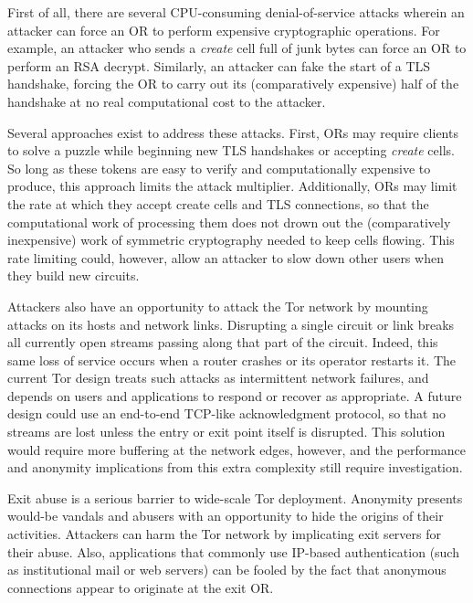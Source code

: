 \documentclass[times,10pt,twocolumn]{article}
\begin{document}
First of all, there are several CPU-consuming denial-of-service
attacks wherein an attacker can force an OR to perform expensive
cryptographic operations.  For example, an attacker who sends a
\emph{create} cell full of junk bytes can force an OR to perform an RSA
decrypt.  Similarly, an attacker can
fake the start of a TLS handshake, forcing the OR to carry out its
(comparatively expensive) half of the handshake at no real computational
cost to the attacker.

Several approaches exist to address these attacks. First, ORs may
require clients to solve a puzzle \cite{puzzles-tls} while beginning new
TLS handshakes or accepting \emph{create} cells.  So long as these
tokens are easy to verify and computationally expensive to produce, this
approach limits the attack multiplier.  Additionally, ORs may limit
the rate at which they accept create cells and TLS connections, so that
the computational work of processing them does not drown out the (comparatively
inexpensive) work of symmetric cryptography needed to keep cells
flowing.  This rate limiting could, however, allow an attacker
to slow down other users when they build new circuits.


Attackers also have an opportunity to attack the Tor network by mounting
attacks on its hosts and network links. Disrupting a single circuit or
link breaks all currently open streams passing along that part of the
circuit. Indeed, this same loss of service occurs when a router crashes
or its operator restarts it. The current Tor design treats such attacks
as intermittent network failures, and depends on users and applications
to respond or recover as appropriate. A future design could use an
end-to-end TCP-like acknowledgment protocol, so that no streams are
lost unless the entry or exit point itself is disrupted. This solution
would require more buffering at the network edges, however, and the
performance and anonymity implications from this extra complexity still
require investigation.

\label{subsec:exitpolicies}


Exit abuse is a serious barrier to wide-scale Tor deployment. Anonymity
presents would-be vandals and abusers with an opportunity to hide
the origins of their activities. Attackers can harm the Tor network by
implicating exit servers for their abuse. Also, applications that commonly
use IP-based authentication (such as institutional mail or web servers)
can be fooled by the fact that anonymous connections appear to originate
at the exit OR.
\end{document}

